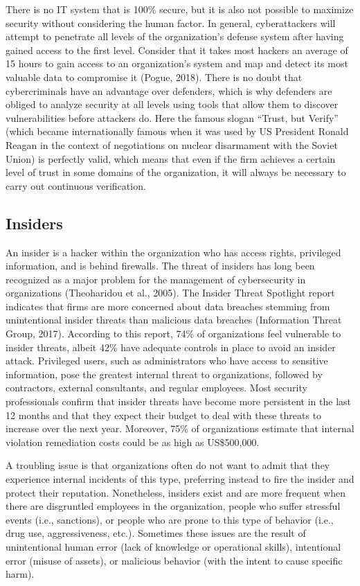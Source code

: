 \documentclass[
  letterpaper,
  DIV=11,
  numbers=noendperiod]{scrreprt}
\begin{document}
There is no IT system that is 100\% secure, but it is also not possible
to maximize security without considering the human factor. In general,
cyberattackers will attempt to penetrate all levels of the
organization's defense system after having gained access to the first
level. Consider that it takes most hackers an average of 15 hours to
gain access to an organization's system and map and detect its most
valuable data to compromise it (Pogue, 2018). There is no doubt that
cybercriminals have an advantage over defenders, which is why defenders
are obliged to analyze security at all levels using tools that allow
them to discover vulnerabilities before attackers do. Here the famous
slogan ``Trust, but Verify'' (which became internationally famous when
it was used by US President Ronald Reagan in the context of negotiations
on nuclear disarmament with the Soviet Union) is perfectly valid, which
means that even if the firm achieves a certain level of trust in some
domains of the organization, it will always be necessary to carry out
continuous verification.

\hypertarget{insiders}{%
\subsection{Insiders}\label{insiders}}

An insider is a hacker within the organization who has access rights,
privileged information, and is behind firewalls. The threat of insiders
has long been recognized as a major problem for the management of
cybersecurity in organizations (Theoharidou et al., 2005). The Insider
Threat Spotlight report indicates that firms are more concerned about
data breaches stemming from unintentional insider threats than malicious
data breaches (Information Threat Group, 2017). According to this
report, 74\% of organizations feel vulnerable to insider threats, albeit
42\% have adequate controls in place to avoid an insider attack.
Privileged users, such as administrators who have access to sensitive
information, pose the greatest internal threat to organizations,
followed by contractors, external consultants, and regular employees.
Most security professionals confirm that insider threats have become
more persistent in the last 12 months and that they expect their budget
to deal with these threats to increase over the next year. Moreover,
75\% of organizations estimate that internal violation remediation costs
could be as high as US\$500,000.

A troubling issue is that organizations often do not want to admit that
they experience internal incidents of this type, preferring instead to
fire the insider and protect their reputation. Nonetheless, insiders
exist and are more frequent when there are disgruntled employees in the
organization, people who suffer stressful events (i.e., sanctions), or
people who are prone to this type of behavior (i.e., drug use,
aggressiveness, etc.). Sometimes these issues are the result of
unintentional human error (lack of knowledge or operational skills),
intentional error (misuse of assets), or malicious behavior (with the
intent to cause specific harm).
\end{document}
